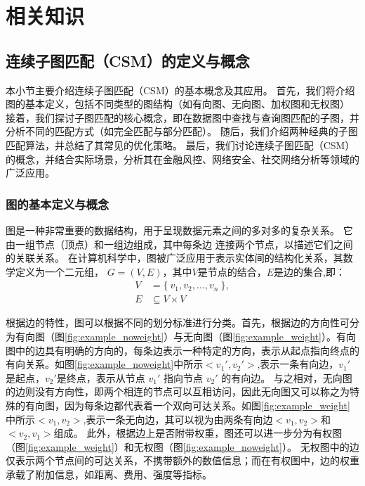 \chapter{相关知识}

\section{连续子图匹配（CSM）的定义与概念}
本小节主要介绍连续子图匹配（CSM）的基本概念及其应用。
首先，我们将介绍图的基本定义，包括不同类型的图结构（如有向图、无向图、加权图和无权图）
接着，我们探讨子图匹配的核心概念，即在数据图中查找与查询图匹配的子图，并分析不同的匹配方式（如完全匹配与部分匹配）。
随后，我们介绍两种经典的子图匹配算法，并总结了其常见的优化策略。
最后，我们讨论连续子图匹配（CSM）的概念，并结合实际场景，分析其在金融风控、网络安全、社交网络分析等领域的广泛应用。
\subsection{图的基本定义与概念}
图是一种非常重要的数据结构，用于呈现数据元素之间的多对多的复杂关系。
它由一组节点（顶点）和一组边组成，其中每条边 连接两个节点，以描述它们之间的关联关系。
在计算机科学中，图被广泛应用于表示实体间的结构化关系，其数学定义为一个二元组，
$G=(V,E)$，其中$V$是节点的结合，$E$是边的集合,即：
\begin{align*}
  V &= \{\ v_1, v_2, \dots, v_n\ \},\\
  E &\subseteq V \times V
\end{align*}

根据边的特性，图可以根据不同的划分标准进行分类。首先，根据边的方向性可分为有向图（图\ref{fig:example_noweight}）与无向图（图\ref{fig:example_weight}）。有向图中的边具有明确的方向的，每条边表示一种特定的方向，表示从起点指向终点的有向关系。如图\ref{fig:example_noweight}中所示$<v_1',v_2'>$,表示一条有向边，$v_1'$是起点，$v_2'$是终点，表示从节点 $v_1'$ 指向节点 $v_2'$ 的有向边。
与之相对，无向图的边则没有方向性，即两个相连的节点可以互相访问，因此无向图又可以称之为特殊的有向图，因为每条边都代表着一个双向可达关系。如图\ref{fig:example_weight}中所示$<v_1,v_2>$,表示一条无向边，其可以视为由两条有向边$<v_1,v_2>$和$<v_2,v_1>$组成。
此外，根据边上是否附带权重，图还可以进一步分为有权图（图\ref{fig:example_weight}）和无权图（图\ref{fig:example_noweight}）。
无权图中的边仅表示两个节点间的可达关系，不携带额外的数值信息；而在有权图中，边的权重承载了附加信息，如距离、费用、强度等指标。

